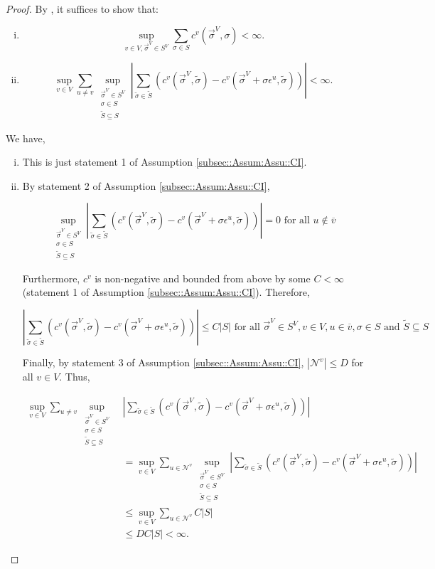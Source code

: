 \documentclass[12pt]{article}
\newcommand{\mc}{\mathcal}
\newcommand{\ov}{\overline}
\newcommand{\te}{\text}
\newcommand{\ep}{\epsilon}
\renewcommand{\v}{v}							%
\newcommand{\vv}{u}								%
\renewcommand{\S}{S}							%
\newcommand{\s}{\sigma}							%
\newcommand{\sv}{\vec{\s}}						%
\newcommand{\ev}{\ep}							%
\newcommand{\IGr}{c}							%
\newcommand{\neigh}{\mc{N}}						%
\newcommand{\vind}[1]{^{#1}}					%
\newcommand{\carp}[1]{^{#1}}					%
\newcommand{\vsi}[1]{^{#1}}						%
\newcommand{\cl}{\ov}							%
\newcommand{\const}{C}							%
\newcommand{\degr}{D}							%
\renewcommand{\ss}{\tilde{\s}}					%
\renewcommand{\SS}{\tilde{\S}}					%
\begin{document}
\begin{proof}
By \cite[Theorem 3.9 (a) and (b)]{Lig85}, it suffices to show that:

\begin{enumerate}[i)]
\item 

\[\sup_{\v \in V,\sv\vsi{V} \in \S\carp{V}} \sum_{\s \in \S} \IGr\vind{\v}(\sv\vsi{V},\s) < \infty.\]

\item 

\[\sup_{\v\in V}\sum_{\vv\neq \v} \sup_{\substack{\sv\vsi{V} \in \S\carp{V}\\ \s\in \S\\ \SS \subseteq \S}} \left|\sum_{\ss \in \SS} (\IGr\vind{\v}(\sv\vsi{V},\ss) - \IGr\vind{\v}(\sv\vsi{V}+\s \ev\vind{\vv},\ss))\right| < \infty.\]
\end{enumerate}

We have,

\begin{enumerate}[i)]
\item This is just statement 1 of Assumption \ref{subsec::Assum:Assu::CI}.

\item By statement 2 of Assumption \ref{subsec::Assum:Assu::CI}, 

\[\sup_{\substack{\sv\vsi{V} \in \S\carp{V}\\ \s\in \S\\ \SS\subseteq \S}} \left|\sum_{\ss \in \SS} (\IGr\vind{\v}(\sv\vsi{V},\ss) - \IGr\vind{\v}(\sv\vsi{V}+\s \ev\vind{\vv},\ss))\right| = 0 \te{ for all } \vv \notin \cl{\v}\]

Furthermore, \(\IGr\vind{\v}\) is non-negative and bounded from above by some \(\const < \infty\) (statement 1 of Assumption \ref{subsec::Assum:Assu::CI}). Therefore, 

\[\left|\sum_{\ss \in \SS} (\IGr\vind{\v}(\sv\vsi{V},\ss) - \IGr\vind{\v}(\sv\vsi{V}+\s\ev\vind{\vv},\ss))\right| \leq \const|\S| \te{ for all } \sv\vsi{V} \in \S\carp{V},\v \in V, \vv \in \cl{\v}, \s \in \S \te{ and } \SS\subseteq \S\]

Finally, by statement 3 of Assumption \ref{subsec::Assum:Assu::CI}, \(|\neigh\vind{\v}| \leq \degr\) for all \(\v \in V\). Thus,

\begin{align*}
\sup_{\v\in V}\sum_{\vv \neq \v} \sup_{\substack{\sv\vsi{V} \in \S\carp{V}\\ \s\in \S\\ \SS\subseteq \S}}& \left|\sum_{\ss \in \SS} (\IGr\vind{\v}(\sv\vsi{V},\ss) - \IGr\vind{\v}(\sv\vsi{V}+\s\ev\vind{\vv},\ss))\right|\\
&  = \sup_{\v\in V}\sum_{\vv\in \neigh\vind{\v}} \sup_{\substack{\sv\vsi{V} \in \S\carp{V}\\ \s\in \S\\ \SS\subseteq \S}} \left|\sum_{\ss \in \SS} (\IGr\vind{\v}(\sv\vsi{V},\ss) - \IGr\vind{\v}(\sv\vsi{V}+\s\ev\vind{\vv},\ss))\right|\\
&\leq \sup_{\v\in V} \sum_{\vv \in \neigh\vind{\v}} \const|\S|\\
&\leq \degr \const|\S| < \infty.
\end{align*}



\end{enumerate}
\end{proof}
\end{document}
